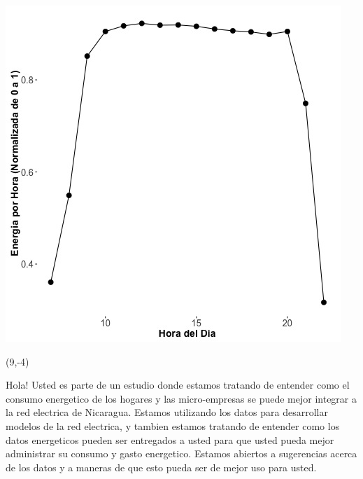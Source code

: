 \documentclass{article}\usepackage[]{graphicx}\usepackage[]{color}
\newenvironment{knitrout}{}{} %
\begin{document}
\begin{knitrout}
\color{fgcolor}
\includegraphics[scale=0.75]{figure/A11_fplot_norm_median} 
\end{knitrout}

 \begin{textblock}{1}(9,-4)
\begin{minipage}{20em}
\begingroup

\endgroup
\end{minipage}
\end{textblock}

\vspace{70px}
\begin{knitrout}
Hola! Usted es parte de un estudio donde estamos tratando de entender como el consumo energetico de los hogares y las micro-empresas se puede mejor integrar a la red electrica de Nicaragua. Estamos utilizando los datos para desarrollar modelos de la red electrica, y tambien estamos tratando de entender como los datos energeticos pueden ser entregados a usted para que usted pueda mejor administrar su consumo y gasto energetico.  Estamos abiertos a sugerencias acerca de los datos y a maneras de que esto pueda ser de mejor uso para usted.
\end{knitrout}
\end{document}
